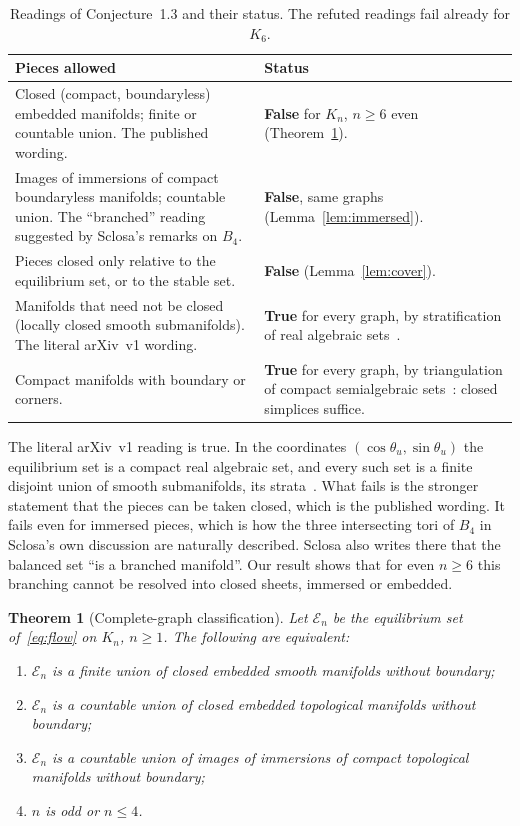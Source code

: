 \documentclass[11pt,a4paper]{article}
\newtheorem{theorem}{Theorem}
\theoremstyle{definition}\newtheorem{conjecture}{Conjecture}
\theoremstyle{remark}\newtheorem{remark}[theorem]{Remark}
\newcommand{\E}{\mathcal E}
\begin{document}
\begin{table}[h]\centering\small
\caption{Readings of Conjecture~1.3 and their status. The refuted readings fail already for $K_6$.}\label{tab:readings}
\begin{tabular}{p{7.7cm}p{6.3cm}}\toprule
Pieces allowed & Status\\\midrule
Closed (compact, boundaryless) embedded manifolds; finite or countable union. The published wording. & \textbf{False} for $K_n$, $n\ge6$ even (Theorem~\ref{thm:classification}).\\
Images of immersions of compact boundaryless manifolds; countable union. The ``branched'' reading suggested by Sclosa's remarks on $B_4$. & \textbf{False}, same graphs (Lemma~\ref{lem:immersed}).\\
Pieces closed only relative to the equilibrium set, or to the stable set. & \textbf{False} (Lemma~\ref{lem:cover}).\\
Manifolds that need not be closed (locally closed smooth submanifolds). The literal arXiv~v1 wording. & \textbf{True} for every graph, by stratification of real algebraic sets~\cite{bcr}.\\
Compact manifolds with boundary or corners. & \textbf{True} for every graph, by triangulation of compact semialgebraic sets~\cite{bcr}: closed simplices suffice.\\\bottomrule
\end{tabular}
\end{table}

The literal arXiv~v1 reading is true. In the coordinates $(\cos\theta_u,\sin\theta_u)$ the equilibrium set is a compact real algebraic set, and every such set is a finite disjoint union of smooth submanifolds, its strata~\cite{bcr}. What fails is the stronger statement that the pieces can be taken closed, which is the published wording. It fails even for immersed pieces, which is how the three intersecting tori of $B_4$ in Sclosa's own discussion are naturally described. Sclosa also writes there that the balanced set ``is a branched manifold''. Our result shows that for even $n\ge6$ this branching cannot be resolved into closed sheets, immersed or embedded.

\begin{theorem}[Complete-graph classification]\label{thm:classification}
Let $\E_n$ be the equilibrium set of~\eqref{eq:flow} on $K_n$, $n\ge1$. The following are equivalent:
\begin{enumerate}[label=(\roman*)]
\item $\E_n$ is a finite union of closed embedded smooth manifolds without boundary;
\item $\E_n$ is a countable union of closed embedded topological manifolds without boundary;
\item $\E_n$ is a countable union of images of immersions of compact topological manifolds without boundary;
\item $n$ is odd or $n\le4$.
\end{enumerate}
\end{theorem}
\end{document}
